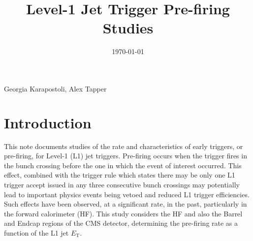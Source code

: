 \documentclass[11pt]{cmspaperpdf}
\newcommand{\et}{\ensuremath{E_{\textrm{T}}}\xspace}
\begin{document}
\begin{titlepage}


\date{\today}

\title{Level-1 Jet Trigger Pre-firing Studies}


\begin{Authlist}
Georgia Karapostoli, Alex Tapper
\end{Authlist}


\end{titlepage}

\newpage
\section{Introduction}

This note documents studies of the rate and characteristics of early triggers, or pre-firing, for Level-1 (L1) jet triggers. Pre-firing occurs when the trigger fires in the bunch crossing before the one in which the event of interest occurred. This effect, combined with the trigger rule which states there may be only one L1 trigger accept issued in any three consecutive bunch crossings may potentially lead to important physics events being vetoed and reduced L1 trigger efficiencies. Such effects have been observed, at a significant rate, in the past, particularly in the forward calorimeter (HF). This study considers the HF and also the Barrel and Endcap regions of the CMS detector, determining the pre-firing rate as a function of the L1 jet \et. 
\end{document}
